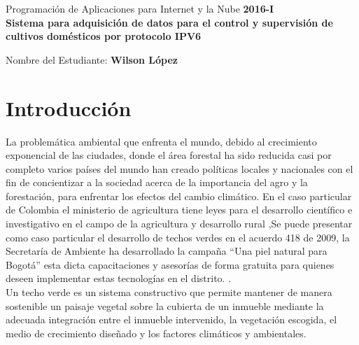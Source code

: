 \documentclass[10pt]{article}\usepackage[]{graphicx}\usepackage[]{color}
\begin{document}
	\renewcommand{\headrulewidth}{0.5pt}
	
	\thispagestyle{empty}						%
	\begin{center}
		\large {Programación de Aplicaciones para Internet y la Nube
			\hspace{5 cm}\textbf{2016-I}}
		\bigskip  
		\textbf{
			\LARGE{\\Sistema para adquisición de datos para el control y supervisión de cultivos domésticos por protocolo IPV6}}\\								%
	\end{center}	
	\begin{flushright}	
		\bigskip	
		Nombre del Estudiante: \textbf{Wilson López}			%
	\end{flushright} 
	
	\section{Introducción}
	
	La problemática ambiental que enfrenta el mundo, debido al crecimiento exponencial de las ciudades, donde el área forestal ha sido reducida casi por completo varios países del mundo han creado políticas locales y nacionales con el fin de concientizar a la sociedad acerca de la importancia del agro y la forestación, para enfrentar los efectos del cambio climático. En el caso particular de Colombia el ministerio de agricultura tiene  leyes para el desarrollo científico e investigativo en el campo de la agricultura  y desarrollo rural \cite{ministerioagricultura} ,Se puede presentar como caso particular el desarrollo de techos verdes en el acuerdo 418 de 2009, la Secretaría de Ambiente ha desarrollado la campaña “Una piel natural para Bogotá” esta dicta capacitaciones y asesorías de forma gratuita para quienes deseen implementar estas tecnologías en el distrito. \cite{ley}.
	\\
	
	Un techo verde es un sistema constructivo que permite mantener de manera sostenible un paisaje vegetal sobre la cubierta de un inmueble mediante la adecuada integración entre el inmueble intervenido, la vegetación escogida, el medio de crecimiento diseñado y los factores climáticos y ambientales. \cite{techoverde}
	
\end{document}
